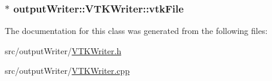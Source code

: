 \subsubsection[{vtk\+File}]{$\ast$ output\+Writer\+::\+V\+T\+K\+Writer\+::vtk\+File\hspace{0.3cm}{\ttfamily [private]}}\label{classoutputWriter_1_1VTKWriter_ab654ea4308b92e5dbdcd9a6833d5ed30}


The documentation for this class was generated from the following files\+:\begin{DoxyCompactItemize}
\item 
src/output\+Writer/\hyperlink{VTKWriter_8h}{V\+T\+K\+Writer.\+h}\item 
src/output\+Writer/\hyperlink{VTKWriter_8cpp}{V\+T\+K\+Writer.\+cpp}\end{DoxyCompactItemize}
